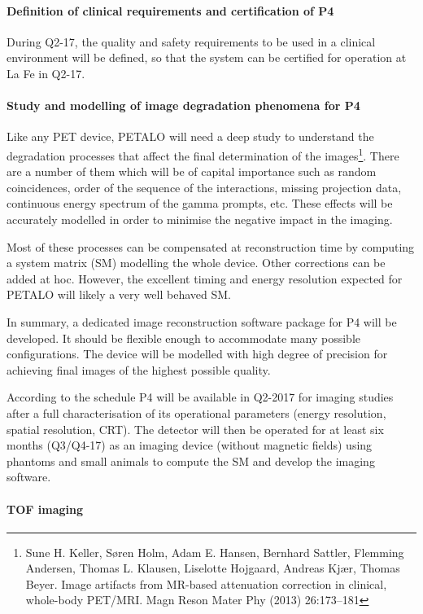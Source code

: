 \paragraph{Definition of clinical requirements and certification of P4}
During Q2-17, the quality and safety requirements to be used in a clinical environment will be defined, so that the system can be certified for operation at La Fe in Q2-17.

\paragraph{Study and modelling of image degradation phenomena for P4}

Like any PET device, PETALO will need a deep study to understand the  
degradation processes that affect the final determination of the images\footnote{Sune H. Keller,  Søren Holm, Adam E. Hansen, Bernhard Sattler, Flemming Andersen, Thomas L. Klausen, Liselotte Hojgaard,  Andreas Kjær, Thomas Beyer. Image artifacts from MR-based attenuation correction in clinical, whole-body PET/MRI. Magn Reson Mater Phy (2013) 26:173–181}. There are a number of them which will be of capital importance such as random coincidences, order of the sequence of the interactions, missing projection data, continuous energy spectrum of the gamma prompts, etc. These effects will be accurately modelled in order to minimise the negative impact in the imaging.

Most of these processes can be compensated at reconstruction time by computing a system matrix (SM) modelling the whole device. Other corrections can be added at hoc. However, the excellent timing and energy resolution expected for PETALO will likely a very well behaved SM. 

In summary, a dedicated image reconstruction software package for P4 will be developed. It should be flexible enough to accommodate many possible configurations. The device will be modelled with high degree of precision for achieving final images of the highest possible quality. 

According to the schedule P4 will be available in Q2-2017 for imaging studies after a full characterisation of its operational parameters (energy resolution, spatial resolution, CRT). The detector will then be operated for at least six months (Q3/Q4-17) as an imaging device (without magnetic fields) using phantoms and small animals to compute the SM and develop the imaging software.  

\paragraph{TOF imaging}


